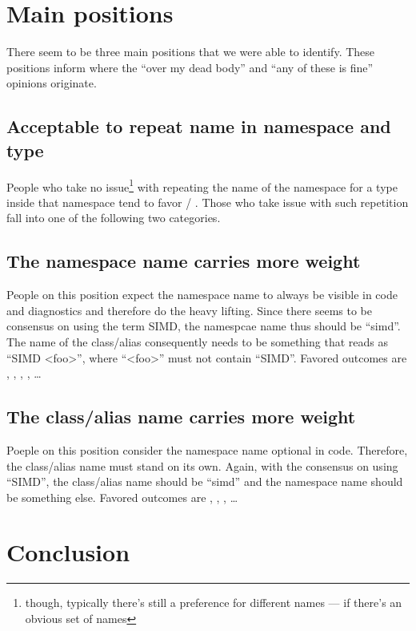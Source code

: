 \section{Main positions}

There seem to be three main positions that we were able to identify.
These positions inform where the “over my dead body” and “any of these is fine” opinions originate.

\subsection{Acceptable to repeat name in namespace and type}
People who take no issue\footnote{though, typically there's still a preference for different names
--- if there's an obvious set of names} with repeating the name of the namespace for a type inside
that namespace tend to favor \stdsimd{} / \stdsimd{}.
Those who take issue with such repetition fall into one of the following two categories.

\subsection{The namespace name carries more weight}
People on this position expect the namespace name to always be visible in code and diagnostics and
therefore do the heavy lifting.
Since there seems to be consensus on using the term SIMD, the namespcae name thus should be “simd”.
The name of the class/alias consequently needs to be something that reads as “SIMD <foo>”, where
“<foo>” must not contain “SIMD”.
Favored outcomes are \stdsimd{}, \stdsimd{}, \stdsimd{},
\stdsimd{}, \ldots

\subsection{The class/alias name carries more weight}
Poeple on this position consider the namespace name optional in code.
Therefore, the class/alias name must stand on its own.
Again, with the consensus on using “SIMD”, the class/alias name should be “simd” and the namespace
name should be something else.
Favored outcomes are \stddatapar{}, \std{},
\std{}, \ldots

\section{Conclusion}

